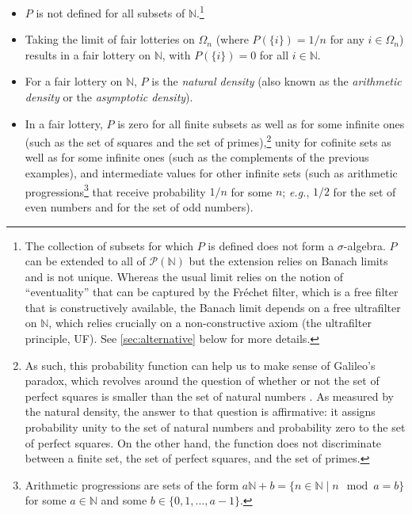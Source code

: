 \begin{itemize}
  \item $P$ is not defined for all subsets of $\mathbb{N}$.\footnote{The collection of subsets for which $P$ is defined does not form a $\sigma$-algebra. $P$ can be extended to all of $\mathcal{P}(\mathbb{N})$ but the extension relies on Banach limits and is not unique. Whereas the usual limit relies on the notion of ``eventuality'' that can be captured by the Fr\'{e}chet filter, which is a free filter that is constructively available, the Banach limit depends on a free ultrafilter on $\mathbb{N}$, which relies crucially on a non-constructive axiom (the ultrafilter principle, UF). See \autoref{sec:alternative} below for more details.}
  \item Taking the limit of fair lotteries on $\Omega_n$ (where $P(\{i\})=1/n$ for any $i \in \Omega_n$) results in a fair lottery on $\mathbb{N}$, with $P(\{i\})=0$ for all $i \in \mathbb{N}$.
  \item For a fair lottery on $\mathbb{N}$, $P$ is the \textit{natural density} (also known as the \textit{arithmetic density} or the \textit{asymptotic density}).
  \item In a fair lottery, $P$ is zero for all finite subsets as well as for some infinite ones (such as the set of squares and the set of primes),\footnote{As such, this probability function can help us to make sense of Galileo's paradox, which revolves around the question of whether or not the set of perfect squares is smaller than the set of natural numbers \citep[see][]{Mancosu:2009}. As measured by the natural density, the answer to that question is affirmative: it assigns probability unity to the set of natural numbers and probability zero to the set of perfect squares. On the other hand, the function does not discriminate between a finite set, the set of perfect squares, and the set of primes.} unity for cofinite sets as well as for some infinite ones (such as the complements of the previous examples), and intermediate values for other infinite sets (such as arithmetic progressions\footnote{Arithmetic progressions are sets of the form $a\mathbb{N}+b = \{ n \in \mathbb{N} \mid n \mod a = b \}$ for some $a \in \mathbb{N}$ and some $b \in \{0,1,\ldots,a-1\}$.} that receive probability $1/n$ for some $n$; \textit{e.g.}, $1/2$ for the set of even numbers and for the set of odd numbers).
\end{itemize}

